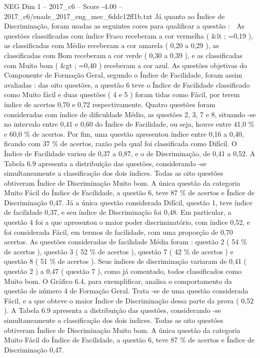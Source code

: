 \begin{textsample}{NEG Dim 1 – 2017\_c6 – Score -4.00 – 2017\_c6/enade\_2017\_eng\_mec\_6ddc12ff1b.txt}
Já quanto ao Índice de Discriminação, foram usadas as seguintes cores para qualificar a questão :  As questões classificadas com índice Fraco receberam a cor vermelha ( \&lt ; =0,19 ), as classificadas com Médio receberam a cor amarela ( 0,20 a 0,29 ), as classificadas com Bom receberam a cor verde ( 0,30 a 0,39 ), e as classificadas com Muito bom ( \&gt ; =0,40 ) receberam a cor azul.
As questões objetivas do Componente de Formação Geral, segundo o Índice de Facilidade, foram assim avaliadas : das oito questões, a questão 6 teve o Índice de Facilidade classificado como Muito fácil e duas questões ( 4 e 5 ) foram tidas como Fácil, por terem índice de acertos 0,70 e 0,72 respectivamente.
Quatro questões foram consideradas com índice de dificuldade Médio, as questões 2, 3, 7 e 8, situando -se no intervalo entre 0,41 e 0,60 do Índice de Facilidade, ou seja, houve entre 41,0 \% e 60,0 \% de acertos.
Por fim, uma questão apresentou índice entre 0,16 a 0,40, ficando com 37 \% de acertos, razão pela qual foi classificada como Difícil.
O Índice de Facilidade variou de 0,37 a 0,87, e o de Discriminação, de 0,41 a 0,52.
A Tabela 6.9 apresenta a distribuição das questões, considerando -se simultaneamente a classificação dos dois índices.
Todas as oito questões obtiveram Índice de Discriminação Muito bom.
A única questão da categoria Muito Fácil do Índice de Facilidade, a questão 6, teve 87 \% de acertos e Índice de Discriminação 0,47.
Já a única questão considerada Difícil, questão 1, teve índice de facilidade 0,37, e seu índice de Discriminação foi 0,48.
Em particular, a questão 4 foi a que apresentou o maior poder discriminatório, com índice 0,52, e foi considerada Fácil, em termos de facilidade, com uma proporção de 0,70 acertos.
As questões consideradas de facilidade Média foram : questão 2 ( 54 \% de acertos ), questão 3 ( 52 \% de acertos ), questão 7 ( 42 \% de acertos ) e questão 8 ( 51 \% de acertos ).
Seus índices de discriminação variaram de 0,41 ( questão 2 ) a 0,47 ( questão 7 ), como já comentado, todos classificados como Muito bom.
O Gráfico 6.4, para exemplificar, analisa o comportamento da questão de número 4 de Formação Geral.
Trata -se de uma questão considerada Fácil, e a que obteve o maior Índice de Discriminação dessa parte da prova ( 0,52 ).
A Tabela 6.9 apresenta a distribuição das questões, considerando -se simultaneamente a classificação dos dois índices.
Todas as oito questões obtiveram Índice de Discriminação Muito bom.
A única questão da categoria Muito Fácil do Índice de Facilidade, a questão 6, teve 87 \% de acertos e Índice de Discriminação 0,47.

\end{textsample}
